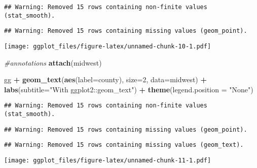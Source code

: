 \documentclass[]{article}
\newenvironment{Shaded}{\begin{snugshade}}{\end{snugshade}}
\newcommand{\KeywordTok}[1]{\textcolor[rgb]{0.13,0.29,0.53}{\textbf{#1}}}
\newcommand{\DataTypeTok}[1]{\textcolor[rgb]{0.13,0.29,0.53}{#1}}
\newcommand{\DecValTok}[1]{\textcolor[rgb]{0.00,0.00,0.81}{#1}}
\newcommand{\StringTok}[1]{\textcolor[rgb]{0.31,0.60,0.02}{#1}}
\newcommand{\CommentTok}[1]{\textcolor[rgb]{0.56,0.35,0.01}{\textit{#1}}}
\newcommand{\OperatorTok}[1]{\textcolor[rgb]{0.81,0.36,0.00}{\textbf{#1}}}
\newcommand{\NormalTok}[1]{#1}
\begin{document}
\begin{verbatim}
## Warning: Removed 15 rows containing non-finite values (stat_smooth).
\end{verbatim}

\begin{verbatim}
## Warning: Removed 15 rows containing missing values (geom_point).
\end{verbatim}

\texttt{[image: ggplot\_files/figure-latex/unnamed-chunk-10-1.pdf]}

\begin{Shaded}
\begin{Highlighting}[]
\CommentTok{#annotations}
\KeywordTok{attach}\NormalTok{(midwest)}

\NormalTok{gg }\OperatorTok{+}\StringTok{ }\KeywordTok{geom_text}\NormalTok{(}\KeywordTok{aes}\NormalTok{(}\DataTypeTok{label=}\NormalTok{county), }\DataTypeTok{size=}\DecValTok{2}\NormalTok{, }\DataTypeTok{data=}\NormalTok{midwest) }\OperatorTok{+}\StringTok{ }\KeywordTok{labs}\NormalTok{(}\DataTypeTok{subtitle=}\StringTok{"With ggplot2::geom_text"}\NormalTok{) }\OperatorTok{+}\StringTok{ }\KeywordTok{theme}\NormalTok{(}\DataTypeTok{legend.position =} \StringTok{"None"}\NormalTok{)}
\end{Highlighting}
\end{Shaded}

\begin{verbatim}
## Warning: Removed 15 rows containing non-finite values (stat_smooth).
\end{verbatim}

\begin{verbatim}
## Warning: Removed 15 rows containing missing values (geom_point).
\end{verbatim}

\begin{verbatim}
## Warning: Removed 15 rows containing missing values (geom_text).
\end{verbatim}

\texttt{[image: ggplot\_files/figure-latex/unnamed-chunk-11-1.pdf]}
\end{document}
